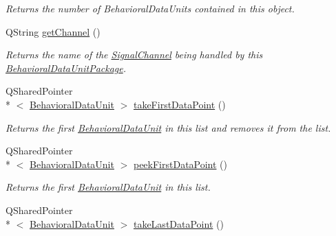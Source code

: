 \begin{DoxyCompactItemize}
\begin{DoxyCompactList}\small\item\em Returns the number of Behavioral\-Data\-Units contained in this object. \end{DoxyCompactList}\item 
\hypertarget{class_picto_1_1_behavioral_data_unit_package_aca3684b1dbb6c621f66eb9e5512ce954}{Q\-String \hyperlink{class_picto_1_1_behavioral_data_unit_package_aca3684b1dbb6c621f66eb9e5512ce954}{get\-Channel} ()}\label{class_picto_1_1_behavioral_data_unit_package_aca3684b1dbb6c621f66eb9e5512ce954}

\begin{DoxyCompactList}\small\item\em Returns the name of the \hyperlink{class_picto_1_1_signal_channel}{Signal\-Channel} being handled by this \hyperlink{class_picto_1_1_behavioral_data_unit_package}{Behavioral\-Data\-Unit\-Package}. \end{DoxyCompactList}\item 
\hypertarget{class_picto_1_1_behavioral_data_unit_package_a3257ec0fa55a01d7b25b86e64bd84963}{Q\-Shared\-Pointer\\*
$<$ \hyperlink{class_picto_1_1_behavioral_data_unit}{Behavioral\-Data\-Unit} $>$ \hyperlink{class_picto_1_1_behavioral_data_unit_package_a3257ec0fa55a01d7b25b86e64bd84963}{take\-First\-Data\-Point} ()}\label{class_picto_1_1_behavioral_data_unit_package_a3257ec0fa55a01d7b25b86e64bd84963}

\begin{DoxyCompactList}\small\item\em Returns the first \hyperlink{class_picto_1_1_behavioral_data_unit}{Behavioral\-Data\-Unit} in this list and removes it from the list. \end{DoxyCompactList}\item 
\hypertarget{class_picto_1_1_behavioral_data_unit_package_a9c609dfb302b35c38ca4a73e4596e4ef}{Q\-Shared\-Pointer\\*
$<$ \hyperlink{class_picto_1_1_behavioral_data_unit}{Behavioral\-Data\-Unit} $>$ \hyperlink{class_picto_1_1_behavioral_data_unit_package_a9c609dfb302b35c38ca4a73e4596e4ef}{peek\-First\-Data\-Point} ()}\label{class_picto_1_1_behavioral_data_unit_package_a9c609dfb302b35c38ca4a73e4596e4ef}

\begin{DoxyCompactList}\small\item\em Returns the first \hyperlink{class_picto_1_1_behavioral_data_unit}{Behavioral\-Data\-Unit} in this list. \end{DoxyCompactList}\item 
\hypertarget{class_picto_1_1_behavioral_data_unit_package_af952aedf712289e835ffd8e92ffa7a8a}{Q\-Shared\-Pointer\\*
$<$ \hyperlink{class_picto_1_1_behavioral_data_unit}{Behavioral\-Data\-Unit} $>$ \hyperlink{class_picto_1_1_behavioral_data_unit_package_af952aedf712289e835ffd8e92ffa7a8a}{take\-Last\-Data\-Point} ()}\label{class_picto_1_1_behavioral_data_unit_package_af952aedf712289e835ffd8e92ffa7a8a}


\end{DoxyCompactItemize}
